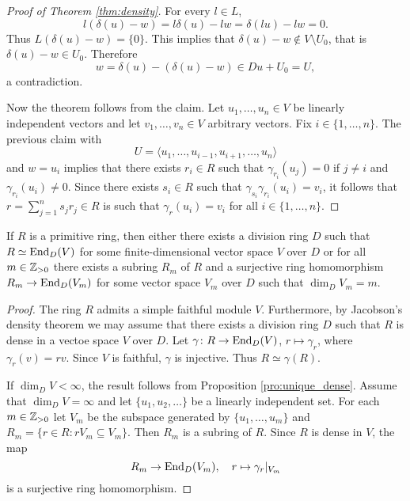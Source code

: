 \begin{proof}[Proof of Theorem \ref{thm:density}]
	For every $l\in L$,  
	\[
		l(\delta(u)-w)=l\delta(u)-lw=\delta(lu)-lw=0.
	\]
	Thus $L(\delta(u)-w)=\{0\}$. This implies that $\delta(u)-w\not\in V\setminus U_0$, 
	that is $\delta(u)-w\in U_0$. Therefore  
	\[
		w=\delta(u)-(\delta(u)-w)\in Du+U_0=U,
	\]
	a contradiction.
	
	Now the theorem follows from the claim. Let 
	$u_1,\dots,u_n\in V$ be linearly independent vectors and let 
	$v_1,\dots,v_n\in V$ arbitrary vectors. Fix $i\in\{1,\dots,n\}$. 
	The previous claim with 
	\[
		U=\langle u_1,\dots,u_{i-1},u_{i+1},\dots,u_n\rangle
	\]
	and $w=u_i$ implies that there exists $r_i\in R$ such that $\gamma_{r_i}(u_j)=0$ if 
	$j\ne i$ and $\gamma_{r_i}(u_i)\ne 0$. Since there exists $s_i\in R$ such that 
	$\gamma_{s_i}\gamma_{r_i}(u_i)=v_i$, it follows that 
	$r=\sum_{j=1}^n s_jr_j\in R$ is such that $\gamma_r(u_i)=v_i$ for all 
	$i\in\{1,\dots,n\}$.
\end{proof}


\begin{corollary}
	If $R$ is a primitive ring, then either there exists a division ring $D$
	such that $R\simeq\operatorname{End}_D(V)$ for some finite-dimensional vector space $V$ over $D$ or 
	for all $m\in\mathbb{Z}_{>0}$ there exists a subring $R_m$ of 
	$R$ and a surjective ring homomorphism $R_m\to\operatorname{End}_D(V_m)$ for some vector space  
	$V_m$ over $D$ such that $\dim_DV_m=m$.
\end{corollary}

\begin{proof}
	The ring $R$ admits a simple faithful module $V$. Furthermore, by Jacobson's density 
	theorem we may assume that there exists a division ring $D$ 
	such that $R$ is dense in a vectoe space $V$ over $D$. 
	Let $\gamma\colon R\to\operatorname{End}_D(V)$, $r\mapsto\gamma_r$, where 
	$\gamma_r(v)=rv$. Since $V$ is faithful, $\gamma$ is injective. Thus 
	$R\simeq\gamma(R)$. 

	If $\dim_DV<\infty$, the result follows from Proposition \ref{pro:unique_dense}. 
	Assume that $\dim_DV=\infty$ and let $\{u_1,u_2,\dots\}$ be a linearly independent set. 
	For each $m\in\mathbb{Z}_{>0}$ let $V_m$ be the subspace generated by $\{u_1,\dots,u_m\}$
	and $R_m=\{r\in R:rV_m\subseteq V_m\}$. Then $R_m$ is a subring of $R$. 
	Since $R$ is dense in $V$, the map 
	\[
		R_m\to \operatorname{End}_D(V_m),\quad
		r\mapsto\gamma_r|_{V_m}
	\]
	is a surjective ring homomorphism. 
\end{proof}

